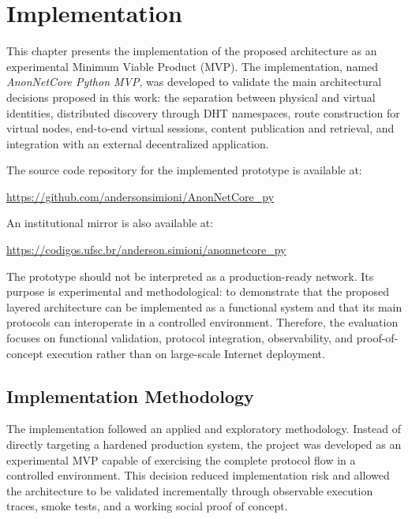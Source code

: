 \documentclass[12pt,a4paper]{article}
\begin{document}
\clearpage
\section{Implementation}

This chapter presents the implementation of the proposed architecture as an experimental Minimum Viable Product (MVP). The implementation, named \textit{AnonNetCore Python MVP}, was developed to validate the main architectural decisions proposed in this work: the separation between physical and virtual identities, distributed discovery through DHT namespaces, route construction for virtual nodes, end-to-end virtual sessions, content publication and retrieval, and integration with an external decentralized application.

The source code repository for the implemented prototype is available at:

\begin{center}
\url{https://github.com/andersonsimioni/AnonNetCore_py}
\end{center}

An institutional mirror is also available at:

\begin{center}
\url{https://codigos.ufsc.br/anderson.simioni/anonnetcore_py}
\end{center}

The prototype should not be interpreted as a production-ready network. Its purpose is experimental and methodological: to demonstrate that the proposed layered architecture can be implemented as a functional system and that its main protocols can interoperate in a controlled environment. Therefore, the evaluation focuses on functional validation, protocol integration, observability, and proof-of-concept execution rather than on large-scale Internet deployment.

\subsection{Implementation Methodology}
\label{sec:implementation-methodology}

The implementation followed an applied and exploratory methodology. Instead of directly targeting a hardened production system, the project was developed as an experimental MVP capable of exercising the complete protocol flow in a controlled environment. This decision reduced implementation risk and allowed the architecture to be validated incrementally through observable execution traces, smoke tests, and a working social proof of concept.
\end{document}
